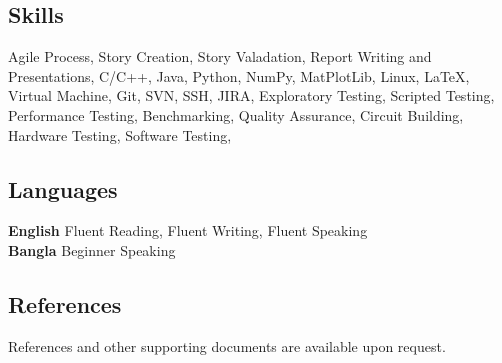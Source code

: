 \documentclass[10pt, twocolumn]{article}
\begin{document}
\subsection*{\color{draculapurple}Skills}
Agile Process,
Story Creation,
Story Valadation,
Report Writing and Presentations,
C/C++,
Java,
Python,
NumPy,
MatPlotLib,
Linux,
\LaTeX,
Virtual Machine,
Git,
SVN,
SSH,
JIRA,
Exploratory Testing,
Scripted Testing,
Performance Testing,
Benchmarking,
Quality Assurance,
Circuit Building,
Hardware Testing,
Software Testing,

\subsection*{\color{draculapurple}Languages}
\textbf{English} Fluent Reading, Fluent Writing, Fluent Speaking\\
\textbf{Bangla} Beginner Speaking

\subsection*{\color{draculapurple}References}
References and other supporting documents are available upon request.
\end{document}
